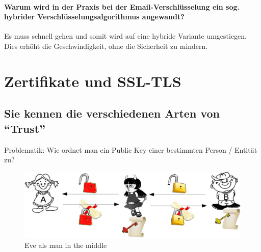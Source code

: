 \documentclass[10pt,a4paper]{article}
\begin{document}
\paragraph*{Warum wird in der Praxis bei der Email-Verschlüsselung ein sog. hybrider Verschlüsselungsalgorithmus angewandt?}Es muss schnell gehen und somit wird auf eine hybride Variante umgestiegen. Dies erhöht die Geschwindigkeit, ohne die Sicherheit zu mindern.


\section{Zertifikate und SSL-TLS}

\subsection*{Sie kennen die verschiedenen Arten von "`Trust"'}
Problematik: Wie ordnet man ein Public Key einer bestimmten Person / Entität zu?
\begin{figure}[H]
    \begin{center}
    \includegraphics[width=14cm]{images/mitma.png}
    \caption{Eve als man in the middle}
    \label{mitma}
    \end{center}
\end{figure}
\end{document}
